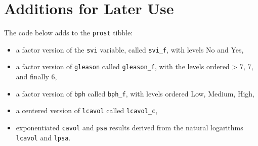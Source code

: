 \documentclass[]{book}
\newenvironment{Shaded}{\begin{snugshade}}{\end{snugshade}}
\newcommand{\KeywordTok}[1]{\textcolor[rgb]{0.13,0.29,0.53}{\textbf{#1}}}
\newcommand{\DataTypeTok}[1]{\textcolor[rgb]{0.13,0.29,0.53}{#1}}
\newcommand{\StringTok}[1]{\textcolor[rgb]{0.31,0.60,0.02}{#1}}
\newcommand{\OperatorTok}[1]{\textcolor[rgb]{0.81,0.36,0.00}{\textbf{#1}}}
\newcommand{\NormalTok}[1]{#1}
\providecommand{\tightlist}{%
  \setlength{\itemsep}{0pt}\setlength{\parskip}{0pt}}
\theoremstyle{definition}
\theoremstyle{definition}
\theoremstyle{definition}
\theoremstyle{remark}
\begin{document}
\section{Additions for Later Use}\label{additions-for-later-use}

The code below adds to the \texttt{prost} tibble:

\begin{itemize}
\tightlist
\item
  a factor version of the \texttt{svi} variable, called \texttt{svi\_f},
  with levels No and Yes,
\item
  a factor version of \texttt{gleason} called \texttt{gleason\_f}, with
  the levels ordered \textgreater{} 7, 7, and finally 6,
\item
  a factor version of \texttt{bph} called \texttt{bph\_f}, with levels
  ordered Low, Medium, High,
\item
  a centered version of \texttt{lcavol} called \texttt{lcavol\_c},
\item
  exponentiated \texttt{cavol} and \texttt{psa} results derived from the
  natural logarithms \texttt{lcavol} and \texttt{lpsa}.
\end{itemize}

\begin{Shaded}
\end{Shaded}
\end{document}
